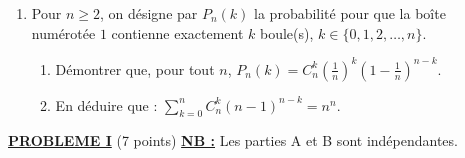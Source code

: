 \begin{description}
\begin{enumerate}
\begin{description}
                                    \item[G :] << La bo\^ite num\'erot\'ee $1$ contient exactement deux boules >>.
                              \end{description}
                        \item Pour $n\geq 2$, on d\'esigne par $P_n(k)$ la probabilit\'e pour que 
                              la bo\^ite num\'erot\'ee $1$ contienne exactement $k$ boule(s), $k\in\{ 0,1,2,\ldots,n\}$.
                              \begin{enumerate}
                                    \item D\'emontrer que, pour tout $n$, 
                                          $P_n(k) = C_n^k \left(\frac{1}{n}\right)^k \left( 1 - \frac{1}{n} \right)^{n-k}$.
                                    \item En d\'eduire que : 
                                          $\sum_{k=0}^n C_n^k (n-1)^{n-k} = n^n$.
                              \end{enumerate}
                  \end{enumerate}
      \end{description}
\noindent \underline{\textsc{\textbf{PROBLEME I}}} (7 points) \newline
%
      \underline{\textbf{NB :}} Les parties A et B sont ind\'ependantes.


